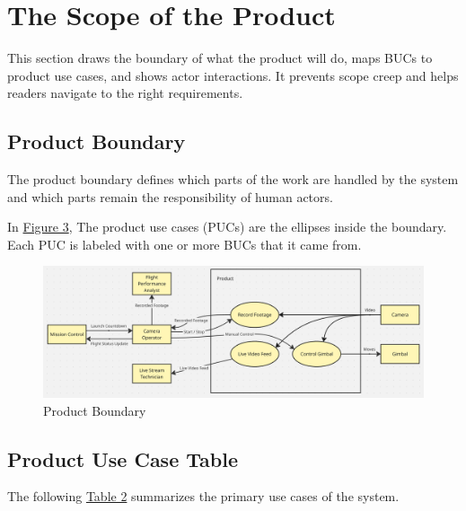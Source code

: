 \documentclass[12pt]{article}
\begin{document}
\section{The Scope of the Product}
This section draws the boundary of what the product will do, maps BUCs to product use cases, and shows actor interactions.
It prevents scope creep and helps readers navigate to the right requirements.
\subsection{Product Boundary}

The product boundary defines which parts of the work are handled by the system
and which parts remain the responsibility of human actors.

In \hyperref[img:product-boundary]{Figure 3}, The product use cases (PUCs) are
the ellipses inside the boundary. Each PUC is labeled with one or more BUCs
that it came from.

\begin{figure}[H]
  \centering
  \includegraphics[width=\textwidth,height=\textheight,keepaspectratio]{../Images/product_boundary.png}
  \caption{Product Boundary}
  \label{img:product-boundary}
\end{figure}

\subsection{Product Use Case Table}

The following \hyperref[tab:product-use-case-table]{Table 2} summarizes the
primary use cases of the system.
\end{document}
